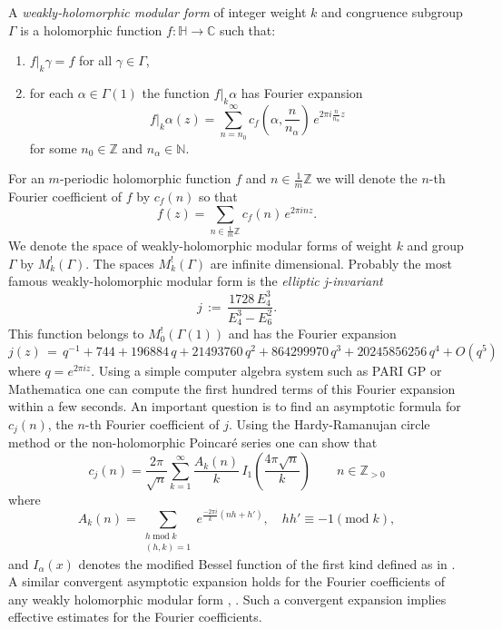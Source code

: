 \documentclass{scrartcl}
\newcommand{\N}{\mathbb{N}}
\newcommand{\Z}{\mathbb{Z}}
\newcommand{\C}{\mathbb{C}}
\newcommand{\h}{\mathbb{H}}
\begin{document}
A \emph{weakly-holomorphic modular form} of integer weight $k$ and congruence subgroup $\Gamma$ is a holomorphic function $f:\h\to\C$ such that:
\begin{enumerate}
 \item $f|_k\gamma=f$ for all $\gamma\in\Gamma$,
 \item for each $\alpha\in\Gamma(1)$ the function $f|_k\alpha$ has  Fourier expansion $$f|_k\alpha (z)=\sum_{n=n_0}^\infty c_f(\alpha,\frac{n}{n_\alpha})\,e^{2\pi i \frac{n}{n_\alpha}z}$$ for some $n_0\in\Z$ and $n_\alpha\in\N$.
\end{enumerate}
For an $m$-periodic holomorphic function $f$ and $n\in\frac 1m \Z$ we will denote the $n$-th Fourier coefficient of $f$ by $c_f(n)$ so that
$$f(z)=\sum_{n\in\frac 1m \Z} c_f(n)\,e^{2\pi i n z}.$$
We denote the space of weakly-holomorphic modular forms of weight $k$ and group $\Gamma$ by $M_k^!(\Gamma)$. The spaces $M_k^!(\Gamma)$ are infinite dimensional.
Probably the most famous weakly-holomorphic modular form is the \emph{elliptic j-invariant}
$$j\,:=\,\frac{1728\, E_4^3}{E_4^3-E_6^2}. $$
This function belongs to $M_0^!(\Gamma(1))$ and has the Fourier expansion
$$j(z)\,=\,q^{-1} + 744 + 196884\, q + 21493760\, q^2 + 864299970\, q^3 +
 20245856256\, q^4 + O(q^5) $$
 where $q=e^{2\pi i z}$. Using a simple computer algebra system such as PARI GP or Mathematica one can compute the first hundred terms of this Fourier expansion within a few seconds. An important question is to find an  asymptotic formula for $c_j(n)$, the $n$-th Fourier coefficient  of $j$. Using the Hardy-Ramanujan circle method \cite[p. 460 -- 461]{Rademacher38} or the non-holomorphic Poincar{\'e} series \cite{Petersson32} one can show that \begin{equation} \label{eqn: j Fourier asymptotic}
 c_j(n)=\frac{2\pi}{\sqrt{n}}\sum_{k=1}^\infty \frac{A_k(n)}{k}\,I_1\left(\frac{4\pi \sqrt{n}}{k}\right)\qquad n\in\Z_{>0}
\end{equation}
 where
 $$A_k(n)= \sum_{\substack{h\;\mathrm{mod}\;k\\(h,k)=1}} e^{\frac{-2\pi i}{k}(nh+h')},\quad hh'\equiv -1(\mbox{mod}\;k),$$
 and $I_\alpha(x)$ denotes the modified Bessel function of the first kind defined as in \cite[Section~9.6]{Abramowitz}. A similar convergent asymptotic expansion holds for the Fourier coefficients of any weakly holomorphic modular form \cite[p.660 -- 662]{Hejhal}, \cite[Propositions~1.10 and~1.12]{Bruinier}. Such a convergent expansion implies effective estimates for the Fourier coefficients.
\end{document}
